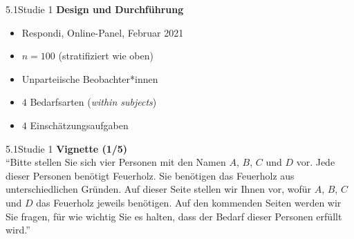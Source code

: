 \documentclass[xcolor=table,9pt,aspectratio=169]{beamer}
\begin{document}
\begin{frame}{\vspace*{10mm}5.1\hspace*{1em}Studie 1}
\textbf{Design und Durchführung}\\
\medskip
\begin{itemize}
   \item Respondi, Online-Panel, Februar 2021
   \item $n=100$ (stratifiziert wie oben)
   \item Unparteiische Beobachter*innen
   \item $4$ Bedarfsarten (\textit{within subjects})
   \item $4$ Einschätzungsaufgaben
\end{itemize}
\end{frame}


\begin{frame}{\vspace*{10mm}5.1\hspace*{1em}Studie 1}
\textbf{Vignette (1/5)}\\
\medskip
\enquote{Bitte stellen Sie sich vier Personen mit den Namen $A$, $B$, $C$ und $D$ vor. Jede dieser Personen benötigt Feuerholz. Sie benötigen das Feuerholz aus unterschiedlichen Gründen. Auf dieser Seite stellen wir Ihnen vor, wofür $A$, $B$, $C$ und $D$ das Feuerholz jeweils benötigen. Auf den kommenden Seiten werden wir Sie fragen, für wie wichtig Sie es halten, dass der Bedarf dieser Personen erfüllt wird.}
\end{frame}
\end{document}
